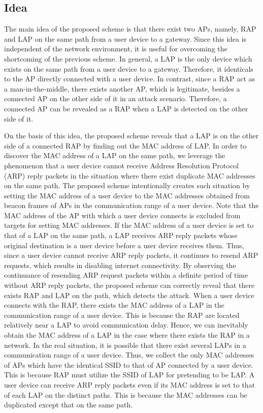 \documentclass[conference]{IEEEtran}
\begin{document}
\subsection{Idea}
The main idea of the proposed scheme is that there exist two APs, namely, RAP and LAP on the same path from a user device to a gateway.
Since this idea is independent of the network environment, it is useful for overcoming the shortcoming of the previous scheme.
In general, a LAP is the only device which exists on the same path from a user device to a gateway.
Therefore, it identicals to the AP directly connected with a user device.
In contrast, since a RAP act as a man-in-the-middle, there exists another AP, which is legitimate, besides a connected AP on the other side of it in an attack scenario.
Therefore, a connected AP can be revealed as a RAP when a LAP is detected on the other side of it.

On the basis of this idea, the proposed scheme reveals that a LAP is on the other side of a connected RAP by finding out the MAC address of LAP.
In order to discover the MAC address of a LAP on the same path, we leverage the phenomenon that a user device cannot receive Address Resolution Protocol (ARP) reply packets in the situation where there exist duplicate MAC addresses on the same path.
The proposed scheme intentionally creates such situation by setting the MAC address of a user device to the MAC addresses obtained from beacon frames of APs in the communication range of a user device.
Note that the MAC address of the AP with which a user device connects is excluded from targets for setting MAC addresses.
If the MAC address of a user device is set to that of a LAP on the same path, a LAP receives ARP reply packets whose original destination is a user device before a user device receives them.
Thus, since a user device cannot receive ARP reply packets, it continues to resend ARP requests, which results in disabling internet connectivity.
By observing the continuance of resending ARP request packets within a definite period of time without ARP reply packets, the proposed scheme can correctly reveal that there exists RAP and LAP on the path, which detects the attack.
When a user device connects with the RAP, there exists the MAC address of a LAP in the communication range of a user device.
This is because the RAP are located relatively near a LAP to avoid communication delay.
Hence, we can inevitably obtain the MAC address of a LAP in the case where there exists the RAP in a network.
In the real situation, it is possible that there exist several LAPs in a communication range of a user device.
Thus, we collect the only MAC addresses of APs which have the identical SSID to that of AP connected by a user device.
This is because RAP must utilize the SSID of LAP for pretending to be LAP.
A user device can receive ARP reply packets even if its MAC address is set to that of each LAP on the distinct paths.
This is because the MAC addresses can be duplicated except that on the same path.
\end{document}
